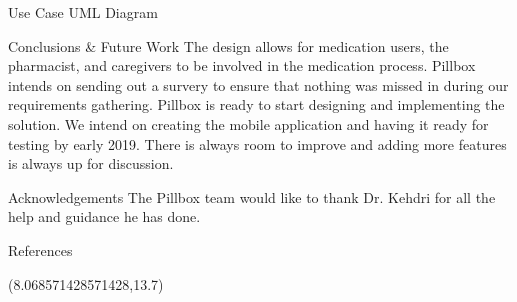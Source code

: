 \documentclass[22pt]{beamer}
\begin{document}
\begin{frame}[fragile]
\begin{textblock}{7.25}
\begin{block}{Use Case UML Diagram}
\end{block}




\begin{block}{Conclusions \& Future Work}
The design allows for medication users, the pharmacist, and caregivers to be involved in the medication process. Pillbox intends on sending out a survery to ensure that nothing was missed in during our requirements gathering. Pillbox is ready to start designing and implementing the solution. We intend on creating the mobile application and having it ready for testing by early 2019. There is always room to improve and adding more features is always up for discussion.

\end{block}

\begin{block}{Acknowledgements}
The Pillbox team would like to thank Dr. Kehdri for all the help and guidance he has done.
\end{block}

\begin{block}{References}

{\scriptsize
}
\end{block}

\end{textblock}


\begin{textblock}{2}(8.068571428571428,13.7)

\end{textblock}

\end{frame}
\end{document}
